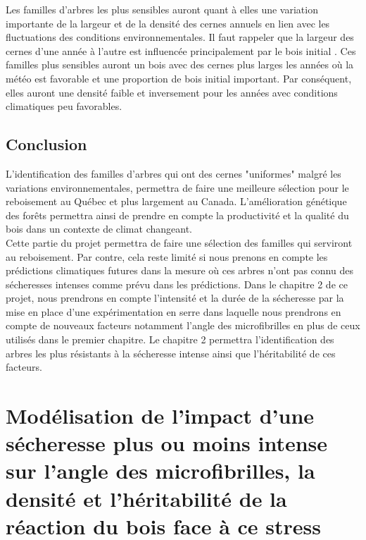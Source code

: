 \documentclass{report}
\begin{document}
Les familles d'arbres les plus sensibles auront quant à elles une variation importante de la largeur et de la densité des cernes annuels en lien avec les fluctuations des conditions environnementales. Il faut rappeler que la largeur des cernes d'une année à l'autre est influencée principalement par le bois initial \citep{Moore2011}. 
Ces familles plus sensibles auront un bois avec des cernes plus larges les années où la météo est favorable et une proportion de bois initial important. Par conséquent, elles auront une densité faible et inversement pour les années avec conditions climatiques peu favorables.\\


\section*{Conclusion}

L'identification des familles d'arbres qui ont des cernes "uniformes" malgré les variations environnementales, permettra de faire une meilleure sélection pour le reboisement au Québec et plus largement au Canada. L'amélioration génétique des forêts permettra ainsi de prendre en compte la productivité et la qualité du bois dans un contexte de climat changeant.\\

Cette partie du projet permettra de faire une sélection des familles qui serviront au reboisement. Par contre, cela reste limité si nous prenons en compte les prédictions climatiques futures dans la mesure où ces arbres n'ont pas connu des sécheresses intenses comme prévu dans les prédictions. Dans le chapitre 2 de ce projet, nous prendrons en compte l'intensité et la durée de la sécheresse par la mise en place d'une expérimentation en serre dans laquelle nous prendrons en compte de nouveaux facteurs notamment l'angle des microfibrilles en plus de ceux utilisés dans le premier chapitre. Le chapitre 2 permettra l'identification des arbres les plus résistants à la sécheresse intense ainsi que l'héritabilité de ces facteurs.  



\chapter{Modélisation de l'impact d'une sécheresse plus ou moins intense sur l'angle des microfibrilles, la densité et l'héritabilité de la réaction du bois face à ce stress}
\end{document}
